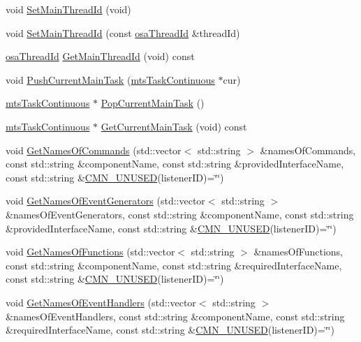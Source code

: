\begin{DoxyCompactItemize}
void \hyperlink{classmts_manager_local_a06392031b4d896336b39a92c44879ad8}{Set\-Main\-Thread\-Id} (void)
\item 
void \hyperlink{classmts_manager_local_a96026c78f75e1a09b7760e7dbcccccf1}{Set\-Main\-Thread\-Id} (const \hyperlink{classosa_thread_id}{osa\-Thread\-Id} \&thread\-Id)
\item 
\hyperlink{classosa_thread_id}{osa\-Thread\-Id} \hyperlink{classmts_manager_local_aef3de1de53d9968b54fc42353b673b11}{Get\-Main\-Thread\-Id} (void) const 
\item 
void \hyperlink{classmts_manager_local_a209ed363a66764defa7dd0416f2202a7}{Push\-Current\-Main\-Task} (\hyperlink{classmts_task_continuous}{mts\-Task\-Continuous} $\ast$cur)
\item 
\hyperlink{classmts_task_continuous}{mts\-Task\-Continuous} $\ast$ \hyperlink{classmts_manager_local_a3e5de6ff1d38576e2e3bb2c2db744b3d}{Pop\-Current\-Main\-Task} ()
\item 
\hyperlink{classmts_task_continuous}{mts\-Task\-Continuous} $\ast$ \hyperlink{classmts_manager_local_ada43572267d4d03144937ef05c006f25}{Get\-Current\-Main\-Task} (void) const 
\item 
void \hyperlink{classmts_manager_local_a9214b281609da7c551470ba57b84bdb1}{Get\-Names\-Of\-Commands} (std\-::vector$<$ std\-::string $>$ \&names\-Of\-Commands, const std\-::string \&component\-Name, const std\-::string \&provided\-Interface\-Name, const std\-::string \&\hyperlink{cmn_portability_8h_a021894e2626935fa2305434b1e893ff6}{C\-M\-N\-\_\-\-U\-N\-U\-S\-E\-D}(listener\-I\-D)=\char`\"{}\char`\"{})
\item 
void \hyperlink{classmts_manager_local_a493fc29ed542912818821bc72d774ce6}{Get\-Names\-Of\-Event\-Generators} (std\-::vector$<$ std\-::string $>$ \&names\-Of\-Event\-Generators, const std\-::string \&component\-Name, const std\-::string \&provided\-Interface\-Name, const std\-::string \&\hyperlink{cmn_portability_8h_a021894e2626935fa2305434b1e893ff6}{C\-M\-N\-\_\-\-U\-N\-U\-S\-E\-D}(listener\-I\-D)=\char`\"{}\char`\"{})
\item 
void \hyperlink{classmts_manager_local_ab868a0aedf66bc7504876c96662eaa7a}{Get\-Names\-Of\-Functions} (std\-::vector$<$ std\-::string $>$ \&names\-Of\-Functions, const std\-::string \&component\-Name, const std\-::string \&required\-Interface\-Name, const std\-::string \&\hyperlink{cmn_portability_8h_a021894e2626935fa2305434b1e893ff6}{C\-M\-N\-\_\-\-U\-N\-U\-S\-E\-D}(listener\-I\-D)=\char`\"{}\char`\"{})
\item 
void \hyperlink{classmts_manager_local_a6eecd5e2e2a7c7334d841d754756c1d1}{Get\-Names\-Of\-Event\-Handlers} (std\-::vector$<$ std\-::string $>$ \&names\-Of\-Event\-Handlers, const std\-::string \&component\-Name, const std\-::string \&required\-Interface\-Name, const std\-::string \&\hyperlink{cmn_portability_8h_a021894e2626935fa2305434b1e893ff6}{C\-M\-N\-\_\-\-U\-N\-U\-S\-E\-D}(listener\-I\-D)=\char`\"{}\char`\"{})

\end{DoxyCompactItemize}
